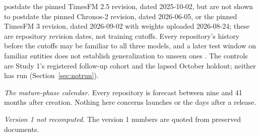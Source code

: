   postdate the pinned TimesFM 2.5 revision, dated 2025-10-02, but are not shown to postdate the pinned
  Chronos-2 revision, dated 2026-06-05, or the pinned TimesFM 3 revision, dated 2026-09-02 with weights
  uploaded 2026-08-24; these are repository revision dates, not training cutoffs. Every repository's history
  before the cutoffs may be familiar to all three models, and a later test window on familiar entities does
  not establish generalization to unseen ones \citep{moghadasi2026}. The controls are Study 1's registered
  follow-up cohort and the lapsed October holdout; neither has run (Section~\ref{sec:notrun}).
\item \emph{The mature-phase calendar.} Every repository is forecast between nine and 41 months after
  creation. Nothing here concerns launches or the days after a release.
\item \emph{Version 1 not recomputed.} The version 1 numbers are quoted from preserved documents.

